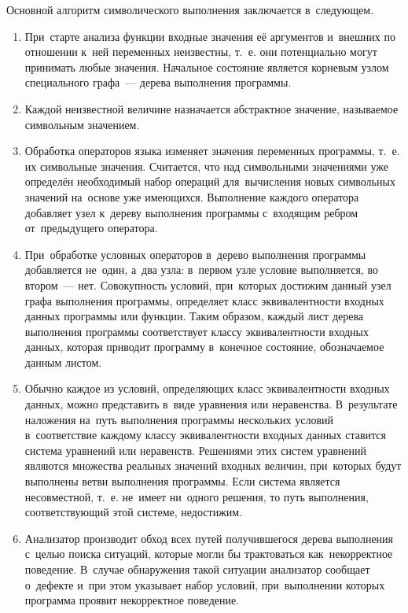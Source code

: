 Основной алгоритм символического выполнения \cite{king76} заключается в~следующем.
\begin{enumerate}
 \item При~старте анализа функции входные значения её аргументов и~внешних по отношении к~ней переменных неизвестны, т.~е. они потенциально могут принимать любые значения. Начальное состояние является корневым узлом специального графа~--- дерева выполнения программы.
 \item Каждой неизвестной величине назначается абстрактное значение, называемое символьным значением.
 \item Обработка операторов языка изменяет значения переменных программы, т.~е. их символьные значения. Считается, что над символьными значениями уже определён необходимый набор операций для~вычисления новых символьных значений на~основе уже имеющихся. Выполнение каждого оператора добавляет узел к~дереву выполнения программы с~входящим ребром от~предыдущего оператора.
 \item При~обработке условных операторов в~дерево выполнения программы добавляется не~один, а~два узла: в~первом узле условие выполняется, во втором~--- нет. Совокупность условий, при~которых достижим данный узел графа выполнения программы, определяет класс эквивалентности входных данных программы или функции. Таким образом, каждый лист дерева выполнения программы соответствует классу эквивалентности входных данных, которая приводит программу в~конечное состояние, обозначаемое данным листом. 
 \item Обычно каждое из условий, определяющих класс эквивалентности входных данных, можно представить в~виде уравнения или неравенства. В~результате наложения на~путь выполнения программы нескольких условий в~соответствие каждому классу эквивалентности входных данных ставится система уравнений или неравенств. Решениями этих систем уравнений являются множества реальных значений входных величин, при~которых будут выполнены ветви выполнения программы. Если система является несовместной, т.~е. не~имеет ни~одного решения, то путь выполнения, соответствующий этой системе, недостижим.
 \item Анализатор производит обход всех путей получившегося дерева выполнения с~целью поиска ситуаций, которые могли бы трактоваться как~некорректное поведение. В~случае обнаружения такой ситуации анализатор сообщает о~дефекте и~при этом указывает набор условий, при~выполнении которых программа проявит некорректное поведение.
\end{enumerate}

